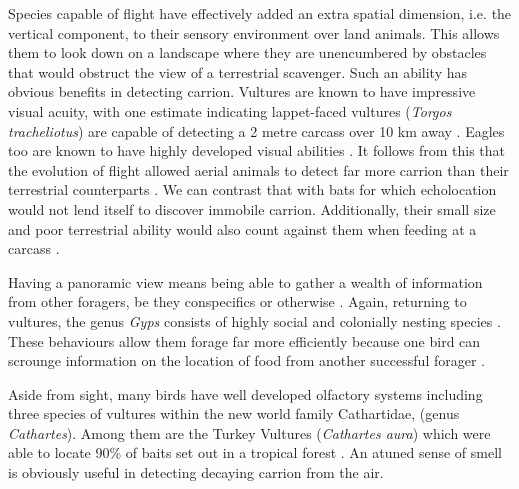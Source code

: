 \documentclass[a4paper,12pt]{article}
\begin{document}
Species capable of flight have effectively added an extra spatial dimension, i.e. the vertical component, to their sensory environment over land animals.
This allows them to look down on a landscape where they are unencumbered by obstacles that would obstruct the view of a terrestrial scavenger.
Such an ability has obvious benefits in detecting carrion.
Vultures are known to have impressive visual acuity, with one estimate indicating lappet-faced vultures %
 (\textit{Torgos tracheliotus}) are capable of detecting a 2 metre carcass over 10 km away \citep{spiegel2013factors}.
Eagles too are known to have highly developed visual abilities \citep{reymond1985spatial}.
It follows from this that the evolution of flight allowed aerial animals to detect far more carrion than their terrestrial counterparts \citep{AR:AR22815}.
We can contrast that with bats for which echolocation would not lend itself to discover immobile carrion.
Additionally, their small size and poor terrestrial ability would also count against them when feeding at a carcass \citep{riskin2006terrestrial}.


Having a panoramic view means being able to gather a wealth of information from other foragers, be they conspecifics or otherwise \citep{jackson2008effect}.
Again, returning to vultures, the genus \textit{Gyps} consists of highly social and colonially nesting species \citep{fernandez2015density}.
These behaviours allow them forage far more efficiently because one bird can scrounge information on the location of food from another successful forager \citep{KaneVul}.



Aside from sight, many birds have well developed olfactory systems \citep{AR:AR22815} including three species of vultures within the new world family Cathartidae, (genus \textit{Cathartes}).
Among them are the Turkey Vultures (\textit{Cathartes aura}) which were able to locate 90\% of baits set out in a tropical forest \citep{houston1986olfaction}.
An atuned sense of smell is obviously useful in detecting decaying carrion from the air.
\end{document}
